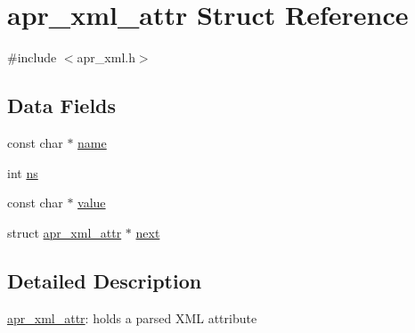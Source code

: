 \hypertarget{structapr__xml__attr}{\section{apr\-\_\-xml\-\_\-attr Struct Reference}
\label{structapr__xml__attr}
}


{\ttfamily \#include $<$apr\-\_\-xml.\-h$>$}

\subsection*{Data Fields}
\begin{DoxyCompactItemize}
\item 
const char $\ast$ \hyperlink{structapr__xml__attr_a2ac25d74e3fd8a521b70af15ae8c1257}{name}
\item 
int \hyperlink{structapr__xml__attr_ad08daf8b0b47796aae04b6aeaa332bc2}{ns}
\item 
const char $\ast$ \hyperlink{structapr__xml__attr_a12f0f611e426fe83704de92b3b11d2e3}{value}
\item 
struct \hyperlink{structapr__xml__attr}{apr\-\_\-xml\-\_\-attr} $\ast$ \hyperlink{structapr__xml__attr_a89a314d3136128eb2a37146ddb30da4f}{next}
\end{DoxyCompactItemize}


\subsection{Detailed Description}
\hyperlink{structapr__xml__attr}{apr\-\_\-xml\-\_\-attr}\-: holds a parsed X\-M\-L attribute 

